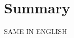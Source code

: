 \chapter*{Summary}\label{chap:summary_eng}

\begin{otherlanguage}{USenglish}
	\alert{SAME IN ENGLISH}
\end{otherlanguage}
